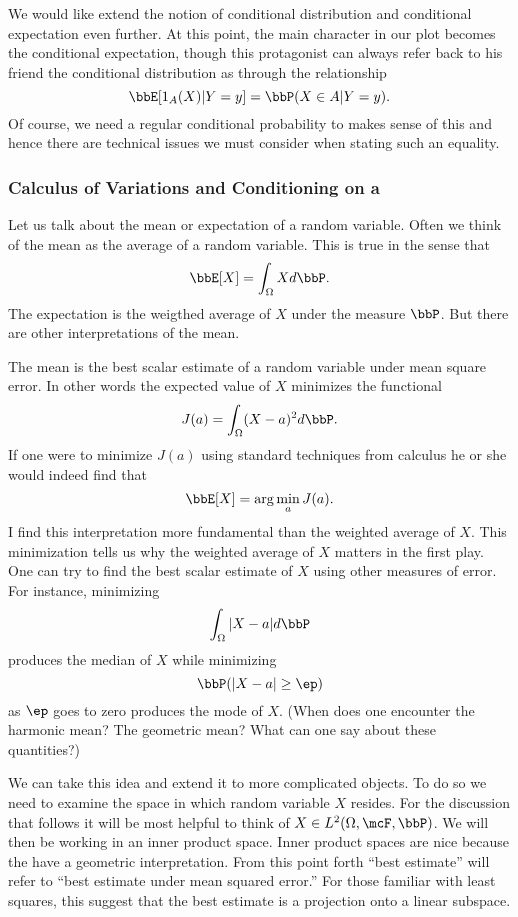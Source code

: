 \documentclass{report}
\begin{document}
We would like extend the notion of conditional distribution and conditional expectation even further.  At this point, the main character in our plot becomes the conditional expectation, though this protagonist can always refer back to his friend the conditional distribution as through the relationship
\[
\bbE[1_A(X) | Y = y] = \bbP(X \in A | Y = y).
\]
Of course, we need a regular conditional probability to makes sense of this and hence there are technical issues we must consider when stating such an equality.

\subsubsection{Calculus of Variations and Conditioning on a \sigalg}

Let us talk about the mean or expectation of a random variable.  Often we think of the mean as the average of a random variable.  This is true in the sense that 
\[
\bbE[X] = \int_\Omega X d \bbP.
\]
The expectation is the weigthed average of $X$ under the measure $\bbP$.  But there are other interpretations of the mean.  

The mean is the best scalar estimate of a random variable under mean square error.  In other words the expected value of $X$ minimizes the functional
\[
J(a) = \int_\Omega (X - a)^2 d \bbP.
\]
If one were to minimize $J(a)$ using standard techniques from calculus he or she would indeed find that
\[
\bbE[X] = \arg \min_a J(a).
\]
I find this interpretation more fundamental than the weighted average of $X$.  This minimization tells us why the weighted average of $X$ matters in the first play.  One can try to find the best scalar estimate of $X$ using other measures of error.  For instance, minimizing
\[
\int_\Omega |X - a| d \bbP
\]
produces the median of $X$ while minimizing
\[
\bbP( |X - a| \geq \ep )
\]
as $\ep$ goes to zero produces the mode of $X$.  (When does one encounter the harmonic mean?  The geometric mean?  What can one say about these quantities?)

We can take this idea and extend it to more complicated objects.  To do so we need to examine the space in which random variable $X$ resides.  For the discussion that follows it will be most helpful to think of $X \in L^2(\Omega, \mcF, \bbP)$.  We will then be working in an inner product space.  Inner product spaces are nice because the have a geometric interpretation.  From this point forth ``best estimate'' will refer to ``best estimate under mean squared error.''  For those familiar with least squares, this suggest that the best estimate is a projection onto a linear subspace.
\end{document}

